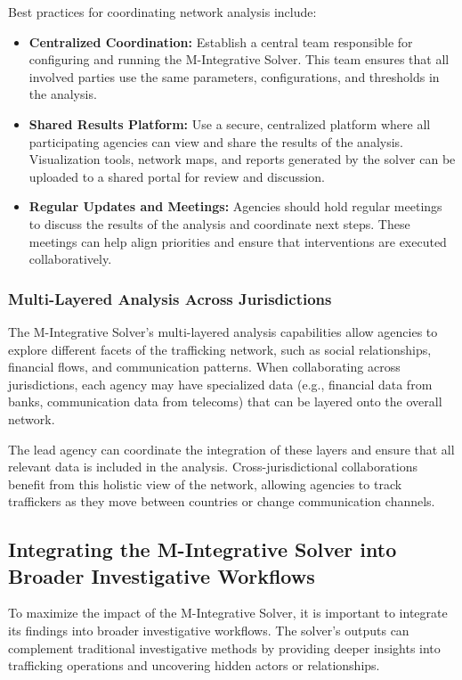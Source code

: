 \documentclass[%
 preprint, linenumbers,
 amsmath,amssymb,
 aps, physrev,
]{revtex4-2}
\begin{document}
Best practices for coordinating network analysis include:
\begin{itemize}
    \item \textbf{Centralized Coordination:} Establish a central team responsible for configuring and running the M-Integrative Solver. This team ensures that all involved parties use the same parameters, configurations, and thresholds in the analysis.
    \item \textbf{Shared Results Platform:} Use a secure, centralized platform where all participating agencies can view and share the results of the analysis. Visualization tools, network maps, and reports generated by the solver can be uploaded to a shared portal for review and discussion.
    \item \textbf{Regular Updates and Meetings:} Agencies should hold regular meetings to discuss the results of the analysis and coordinate next steps. These meetings can help align priorities and ensure that interventions are executed collaboratively.
\end{itemize}

\subsubsection{Multi-Layered Analysis Across Jurisdictions}

The M-Integrative Solver’s multi-layered analysis capabilities allow agencies to explore different facets of the trafficking network, such as social relationships, financial flows, and communication patterns. When collaborating across jurisdictions, each agency may have specialized data (e.g., financial data from banks, communication data from telecoms) that can be layered onto the overall network.

The lead agency can coordinate the integration of these layers and ensure that all relevant data is included in the analysis. Cross-jurisdictional collaborations benefit from this holistic view of the network, allowing agencies to track traffickers as they move between countries or change communication channels.

\subsection{Integrating the M-Integrative Solver into Broader Investigative Workflows}

To maximize the impact of the M-Integrative Solver, it is important to integrate its findings into broader investigative workflows. The solver’s outputs can complement traditional investigative methods by providing deeper insights into trafficking operations and uncovering hidden actors or relationships.
\end{document}
